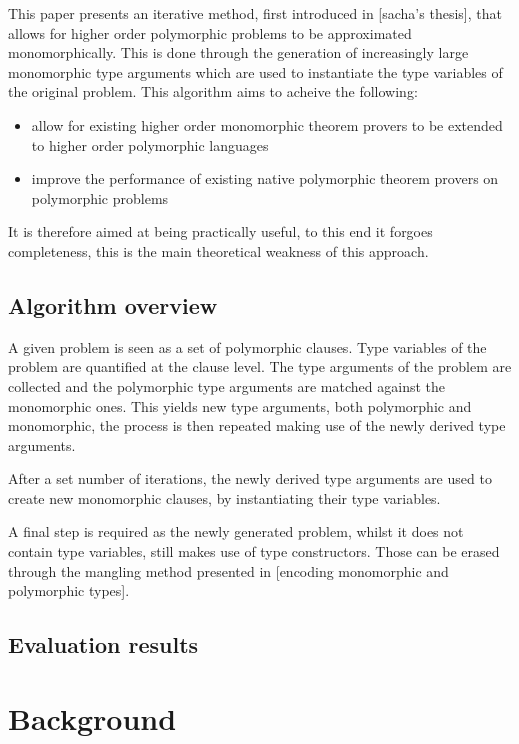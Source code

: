 \documentclass[]{ceurart}
\begin{document}
This paper presents an iterative method, first introduced in [sacha's thesis], that allows for higher order polymorphic problems to be approximated monomorphically. This is done through the generation of increasingly large monomorphic type arguments which are used to instantiate the type variables of the original problem. This algorithm aims to acheive the following:
   \begin{itemize}
      \item allow for existing higher order monomorphic theorem provers to be extended to higher order polymorphic languages
      \item improve the performance of existing native polymorphic theorem provers on polymorphic problems
   \end{itemize}

It is therefore aimed at being practically useful, to this end it forgoes completeness, this is the main theoretical weakness of this approach.

\subsection{Algorithm overview}
A given problem is seen as a set of polymorphic clauses. Type variables of the problem are quantified at the clause level. The type arguments of the problem are collected and the polymorphic type arguments are matched against the monomorphic ones. This yields new type arguments, both polymorphic and monomorphic, the process is then repeated making use of the newly derived type arguments.

After a set number of iterations, the newly derived type arguments are used to create new monomorphic clauses, by instantiating their type variables.
   
A final step is required as the newly generated problem, whilst it does not contain type variables, still makes use of type constructors. Those can be erased through the mangling method presented in [encoding monomorphic and polymorphic types].


\subsection{Evaluation results}


\section{Background}
\end{document}
